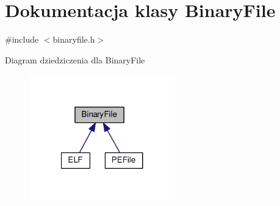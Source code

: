 \hypertarget{class_binary_file}{\section{Dokumentacja klasy Binary\-File}
\label{class_binary_file}
}


{\ttfamily \#include $<$binaryfile.\-h$>$}



Diagram dziedziczenia dla Binary\-File
\nopagebreak
\begin{figure}[H]
\begin{center}
\leavevmode
\includegraphics[width=179pt]{class_binary_file__inherit__graph}
\end{center}
\end{figure}
